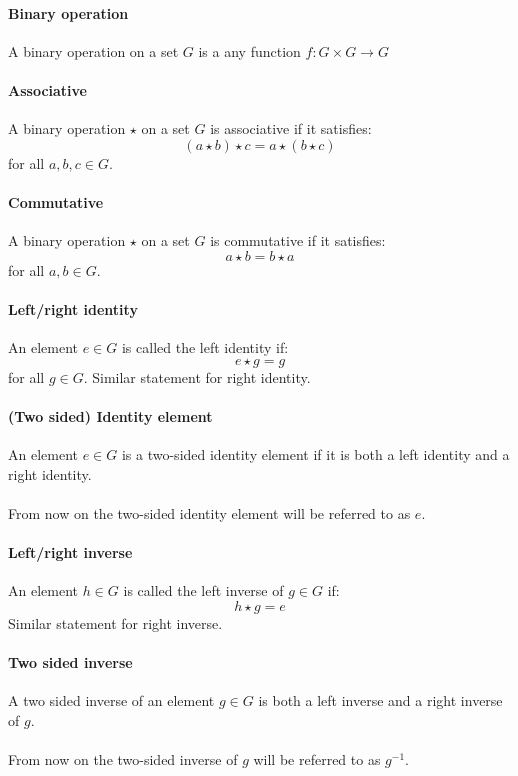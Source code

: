 \documentclass{article}
\begin{document}
\paragraph{Binary operation}
A binary operation on a set $ G $ is a any function $ f: G \times G \to G $
\paragraph{Associative}
A binary operation $ \star $ on a set $ G $ is associative if it satisfies:
\begin{equation}
(a \star b) \star c = a \star (b \star c)
\end{equation}
for all $ a, b, c \in G $.
\paragraph{Commutative}
A binary operation $ \star $ on a set $ G $ is commutative if it satisfies:
\begin{equation}
a \star b = b \star a
\end{equation}
for all $ a, b \in G $.
\paragraph{Left/right identity}
An element $ e \in G $ is called the left identity if:
\begin{equation}
e \star g = g
\end{equation}
for all $ g \in G $. Similar statement for right identity.
\paragraph{(Two sided) Identity element}
An element $ e \in G $ is a two-sided identity element if it is both a left identity and a right identity.
\\\\
From now on the two-sided identity element will be referred to as $ e $.
\paragraph{Left/right inverse}
An element $ h \in G $ is called the left inverse  of $ g \in G $ if:
\begin{equation}
h \star g = e
\end{equation}
Similar statement for right inverse.
\paragraph{Two sided inverse}
A two sided inverse of an element $ g \in G $ is both a left inverse and a right inverse of $ g $.
\\\\
From now on the two-sided inverse of $ g $ will be referred to as $ g^{-1} $.
\end{document}
